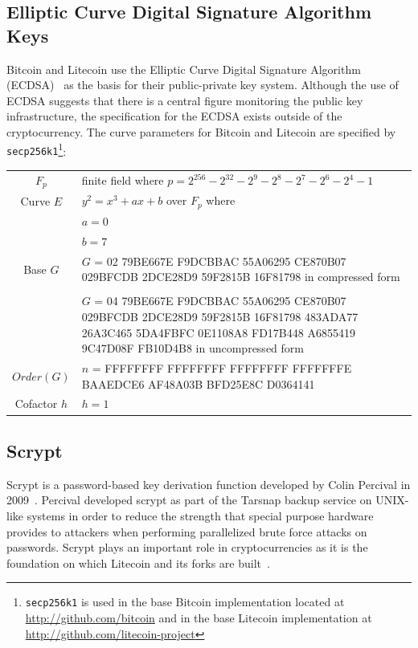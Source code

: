 \documentclass[11pt]{article}
\begin{document}
\subsection{Elliptic Curve Digital Signature Algorithm Keys}
Bitcoin and Litecoin use the Elliptic Curve Digital Signature Algorithm (ECDSA)~\cite{johnson01}
as the basis for their public-private key system. Although the use of ECDSA
suggests that there is a central figure monitoring the public key
infrastructure, the specification for the ECDSA exists outside of the
cryptocurrency. The curve parameters for Bitcoin and Litecoin are specified by
{\tt secp256k1}\footnote{{\tt secp256k1} is used in the base
Bitcoin implementation located at \url{http://github.com/bitcoin} and in the base
Litecoin implementation at \url{http://github.com/litecoin-project}}\cite{secg}:
\vspace{1em}\\
\begin{tabularx}{\textwidth}{cX}
    $F_p$ & finite field where
        $p = 2^{256} - 2^{32} - 2^9 - 2^8 - 2^7 - 2^6 - 2^4 - 1$\\
    Curve $E$ & $y^2 = x^3 + ax + b$ over $F_p$ where\\
    & $a = 0$\\
    & $b = 7$\\
    Base $G$ & $G$ = 02 79BE667E F9DCBBAC 55A06295 CE870B07 029BFCDB 2DCE28D9
        59F2815B 16F81798 in compressed form\\
    & \\
             & $G$ = 04 79BE667E F9DCBBAC 55A06295 CE870B07 029BFCDB 2DCE28D9 59F2815B 16F81798 483ADA77 26A3C465 5DA4FBFC 0E1108A8 FD17B448 A6855419 9C47D08F FB10D4B8 in uncompressed form\\
    $Order(G)$ & $n$ = FFFFFFFF FFFFFFFF FFFFFFFF FFFFFFFE BAAEDCE6 AF48A03B
        BFD25E8C D0364141\\
    Cofactor $h$ & $h = 1$
\end{tabularx}

\subsection{Scrypt}
Scrypt is a password-based key derivation function developed by Colin Percival
in 2009~\cite{percival09}. Percival developed scrypt as part of the Tarsnap
backup service on UNIX-like systems in order to reduce the strength that
special purpose hardware provides to attackers when performing parallelized
brute force attacks on passwords. Scrypt plays an important role in
cryptocurrencies as it is the foundation on which Litecoin and its forks are
built~\cite{sprankel13}.
\end{document}
